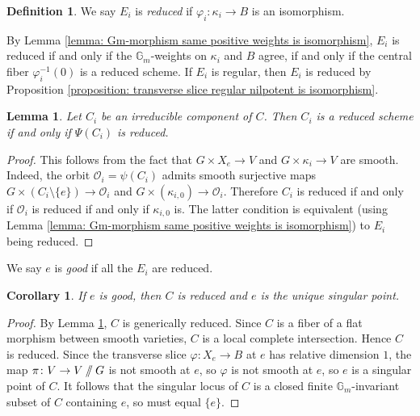 \documentclass{article} %
\newtheorem{lemma}[proposition]{Lemma}
\newtheorem{corollary}[proposition]{Corollary}
\numberwithin{equation}{section}
\theoremstyle{definition}
\newtheorem{definition}[proposition]{Definition}
\newcommand{\G}{\mathbb{G}}
\renewcommand{\O}{\mathcal{O}}
\newcommand{\GIT}{\mathbin{/\mkern-6mu/}}
\begin{document}
\begin{definition}\label{definition: reduced orbit}
    We say $E_i$ is \emph{reduced} if $\varphi_i\colon \kappa_i\rightarrow B$ is an isomorphism.
\end{definition}
By Lemma \ref{lemma: Gm-morphism same positive weights is isomorphism}, $E_i$ is reduced if and only if the $\G_m$-weights on $\kappa_i$ and $B$ agree, if and only if the central fiber $\varphi_i^{-1}(0)$ is a reduced scheme.
If $E_i$ is regular, then $E_i$ is reduced by Proposition \ref{proposition: transverse slice regular nilpotent is isomorphism}.


\begin{lemma}\label{lemma: irred component reduced iff corr nilpotent is reduced}
    Let $C_i$ be an irreducible component of $C$.
    Then $C_i$ is a reduced scheme if and only if $\Psi(C_i)$ is reduced.
\end{lemma}
\begin{proof}
    This follows from the fact that $G\times X_e\rightarrow V$ and $G\times \kappa_i\rightarrow V$ are smooth.
    Indeed, the orbit $\O_i = \psi(C_i)$ admits smooth surjective maps $G\times (C_i\setminus \{e\})\rightarrow \O_i$ and $G\times (\kappa_{i,0})\rightarrow \O_i$.
    Therefore $C_i$ is reduced if and only if $\O_i$ is reduced if and only if $\kappa_{i,0}$ is.
    The latter condition is equivalent (using Lemma \ref{lemma: Gm-morphism same positive weights is isomorphism}) to $E_i$ being reduced.
\end{proof}


We say $e$ is \emph{good} if all the $E_i$ are reduced. 

\begin{corollary}\label{corollary: good e has central fiber reduced and unique singular point}
    If $e$ is good, then $C$ is reduced and $e$ is the unique singular point.
\end{corollary}
\begin{proof}
    By Lemma \ref{lemma: irred component reduced iff corr nilpotent is reduced}, $C$ is generically reduced.
    Since $C$ is a fiber of a flat morphism between smooth varieties, $C$ is a local complete intersection. Hence $C$ is reduced.
    Since the transverse slice $\varphi \colon X_e\rightarrow B$ at $e$ has relative dimension $1$, the map $\pi\colon V\rightarrow V\GIT G$ is not smooth at $e$, so $\varphi$ is not smooth at $e$, so $e$ is a singular point of $C$.
    It follows that the singular locus of $C$ is a closed finite $\G_m$-invariant subset of $C$ containing $e$, so must equal $\{e\}$.
\end{proof}
\end{document}
